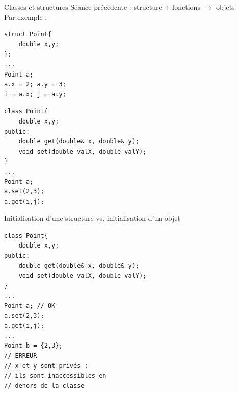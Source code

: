 \begin{frame}[fragile=singleslide]{Classes et structures}
    Séance précédente : structure + fonctions $\longrightarrow$ objets\\
    Par exemple :\\
    \begin{minipage}{0.38\linewidth}
        
            \begin{verbatim}
struct Point{
    double x,y;
};
...
Point a;
a.x = 2; a.y = 3;
i = a.x; j = a.y;
            \end{verbatim}
        
    \end{minipage}
    \hfill
    \begin{minipage}{0.58\linewidth}
        
            \begin{verbatim}
class Point{
    double x,y;
public:
    double get(double& x, double& y);
    void set(double valX, double valY);
}
...
Point a;
a.set(2,3);
a.get(i,j);
            \end{verbatim}
        
    \end{minipage}
\end{frame}

\begin{frame}[fragile=singleslide]{Initialisation d'une structure vs. initialisation d'un objet}
            \begin{verbatim}
class Point{
    double x,y;
public:
    double get(double& x, double& y);
    void set(double valX, double valY);
}
...
Point a; // OK
a.set(2,3);
a.get(i,j);
...
Point b = {2,3};
// ERREUR
// x et y sont privés :
// ils sont inaccessibles en
// dehors de la classe
            \end{verbatim}
\end{frame}

